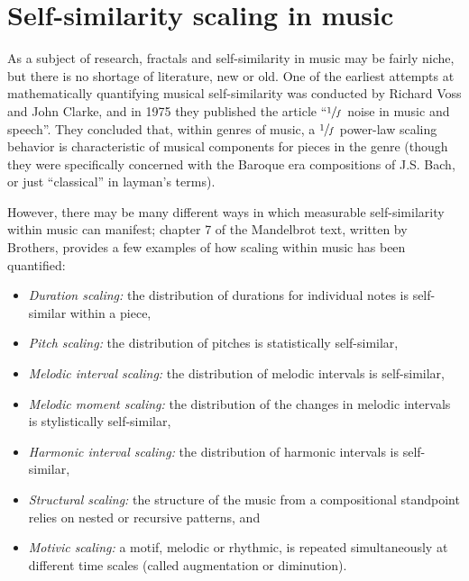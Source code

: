 \documentclass{article}
\begin{document}
\section{Self-similarity scaling in music}

As a subject of research, fractals and self-similarity in music may be fairly
niche, but there is no shortage of literature, new or old. One of the earliest
attempts at mathematically quantifying musical self-similarity was conducted by
Richard Voss and John Clarke, and in 1975 they published the article ``$\sfrac 1
f$ noise in music and speech''. They concluded that, within genres of music, a
$\sfrac 1 f$ power-law scaling behavior is characteristic of musical components
for pieces in the genre (though they were specifically concerned with the
Baroque era compositions of J.S. Bach, or just ``classical'' in layman's terms).

However, there may be many different ways in which measurable self-similarity
within music can manifest; chapter 7 of the Mandelbrot text, written by
Brothers, provides a few examples of how scaling within music has been
quantified:

\begin{itemize}
    \item \emph{Duration scaling:}
        the distribution of durations for individual notes is self-similar within a
        piece,
    \item \emph{Pitch scaling:}
        the distribution of pitches is statistically self-similar,
    \item \emph{Melodic interval scaling:}
        the distribution of melodic intervals is self-similar,
    \item \emph{Melodic moment scaling:}
        the distribution of the changes in melodic intervals is stylistically
        self-similar,
    \item \emph{Harmonic interval scaling:}
        the distribution of harmonic intervals is self-similar,
    \item \emph{Structural scaling:}
        the structure of the music from a compositional standpoint relies on nested
        or recursive patterns, and
    \item \emph{Motivic scaling:}
        a motif, melodic or rhythmic, is repeated simultaneously at different time
        scales (called augmentation or diminution).
\end{itemize}
\end{document}

